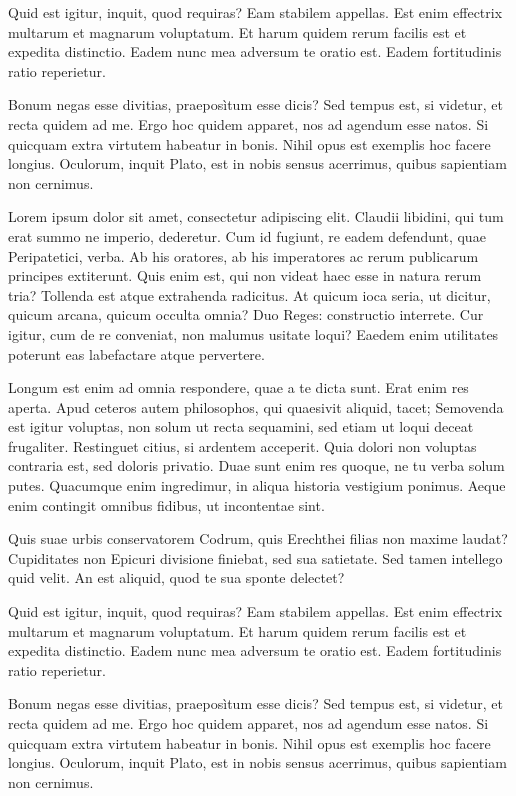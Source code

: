 \documentclass[12pt,twoside]{article}
\begin{document}
	Quid est igitur, inquit, quod requiras? Eam stabilem appellas. Est enim effectrix multarum et magnarum voluptatum. Et harum quidem rerum facilis est et expedita distinctio. Eadem nunc mea adversum te oratio est. Eadem fortitudinis ratio reperietur.
	
	Bonum negas esse divitias, praeposìtum esse dicis? Sed tempus est, si videtur, et recta quidem ad me. Ergo hoc quidem apparet, nos ad agendum esse natos. Si quicquam extra virtutem habeatur in bonis. Nihil opus est exemplis hoc facere longius. Oculorum, inquit Plato, est in nobis sensus acerrimus, quibus sapientiam non cernimus.
	
	Lorem ipsum dolor sit amet, consectetur adipiscing elit. Claudii libidini, qui tum erat summo ne imperio, dederetur. Cum id fugiunt, re eadem defendunt, quae Peripatetici, verba. Ab his oratores, ab his imperatores ac rerum publicarum principes extiterunt. Quis enim est, qui non videat haec esse in natura rerum tria? Tollenda est atque extrahenda radicitus. At quicum ioca seria, ut dicitur, quicum arcana, quicum occulta omnia? Duo Reges: constructio interrete. Cur igitur, cum de re conveniat, non malumus usitate loqui? Eaedem enim utilitates poterunt eas labefactare atque pervertere.
	
	Longum est enim ad omnia respondere, quae a te dicta sunt. Erat enim res aperta. Apud ceteros autem philosophos, qui quaesivit aliquid, tacet; Semovenda est igitur voluptas, non solum ut recta sequamini, sed etiam ut loqui deceat frugaliter. Restinguet citius, si ardentem acceperit. Quia dolori non voluptas contraria est, sed doloris privatio. Duae sunt enim res quoque, ne tu verba solum putes. Quacumque enim ingredimur, in aliqua historia vestigium ponimus. Aeque enim contingit omnibus fidibus, ut incontentae sint.
	
	Quis suae urbis conservatorem Codrum, quis Erechthei filias non maxime laudat? Cupiditates non Epicuri divisione finiebat, sed sua satietate. Sed tamen intellego quid velit. An est aliquid, quod te sua sponte delectet?
	
	Quid est igitur, inquit, quod requiras? Eam stabilem appellas. Est enim effectrix multarum et magnarum voluptatum. Et harum quidem rerum facilis est et expedita distinctio. Eadem nunc mea adversum te oratio est. Eadem fortitudinis ratio reperietur.
	
	Bonum negas esse divitias, praeposìtum esse dicis? Sed tempus est, si videtur, et recta quidem ad me. Ergo hoc quidem apparet, nos ad agendum esse natos. Si quicquam extra virtutem habeatur in bonis. Nihil opus est exemplis hoc facere longius. Oculorum, inquit Plato, est in nobis sensus acerrimus, quibus sapientiam non cernimus.
	
\end{document}
